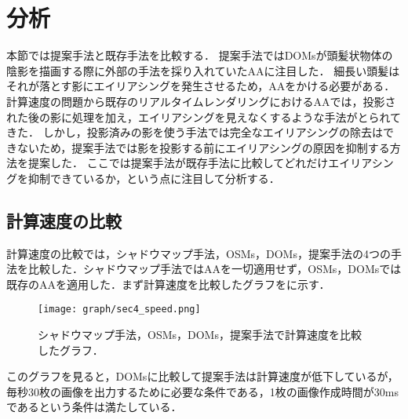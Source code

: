 \section{分析}
\label{sec:analyze}
本節では提案手法と既存手法を比較する．
提案手法ではDOMsが頭髪状物体の陰影を描画する際に外部の手法を採り入れていたAAに注目した．
細長い頭髪はそれが落とす影にエイリアシングを発生させるため，AAをかける必要がある．
計算速度の問題から既存のリアルタイムレンダリングにおけるAAでは，投影された後の影に処理を加え，エイリアシングを見えなくするような手法がとられてきた．
しかし，投影済みの影を使う手法では完全なエイリアシングの除去はできないため，提案手法では影を投影する前にエイリアシングの原因を抑制する方法を提案した．
ここでは提案手法が既存手法に比較してどれだけエイリアシングを抑制できているか，という点に注目して分析する．
%
\subsection{計算速度の比較}
計算速度の比較では，シャドウマップ手法，OSMs，DOMs，提案手法の4つの手法を比較した．シャドウマップ手法ではAAを一切適用せず，OSMs，DOMsでは既存のAAを適用した．まず計算速度を比較したグラフをに示す．
\begin{figure}[htb]
  \centering
    \texttt{[image: graph/sec4\_speed.png]}
    \caption{シャドウマップ手法，OSMs，DOMs，提案手法で計算速度を比較したグラフ．}
    \label{fig:speed}
\end{figure}
このグラフを見ると，DOMsに比較して提案手法は計算速度が低下しているが，毎秒30枚の画像を出力するために必要な条件である，1枚の画像作成時間が30msであるという条件は満たしている．
%

